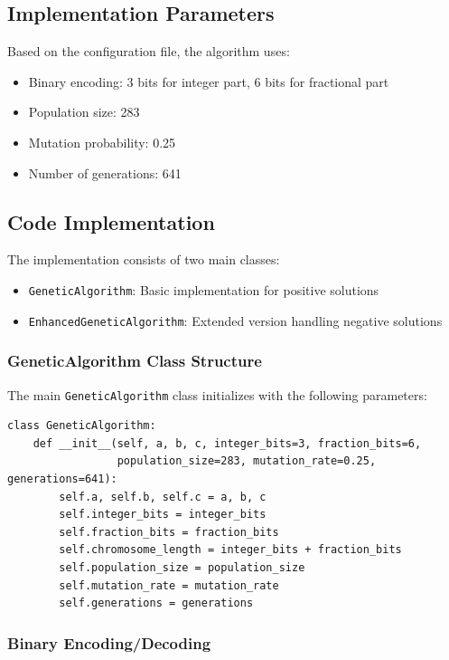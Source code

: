 \documentclass[11pt,a4paper]{article}
\begin{document}
\subsection{Implementation Parameters}

Based on the configuration file, the algorithm uses:
\begin{itemize}
\item Binary encoding: 3 bits for integer part, 6 bits for fractional part
\item Population size: 283
\item Mutation probability: 0.25
\item Number of generations: 641
\end{itemize}

\subsection{Code Implementation}

The implementation consists of two main classes:
\begin{itemize}
\item \texttt{GeneticAlgorithm}: Basic implementation for positive solutions
\item \texttt{EnhancedGeneticAlgorithm}: Extended version handling negative solutions
\end{itemize}

\subsubsection{GeneticAlgorithm Class Structure}

The main \texttt{GeneticAlgorithm} class initializes with the following parameters:

\begin{verbatim}
class GeneticAlgorithm:
    def __init__(self, a, b, c, integer_bits=3, fraction_bits=6, 
                 population_size=283, mutation_rate=0.25, generations=641):
        self.a, self.b, self.c = a, b, c
        self.integer_bits = integer_bits
        self.fraction_bits = fraction_bits
        self.chromosome_length = integer_bits + fraction_bits
        self.population_size = population_size
        self.mutation_rate = mutation_rate
        self.generations = generations
\end{verbatim}

\subsubsection{Binary Encoding/Decoding}
\end{document}
